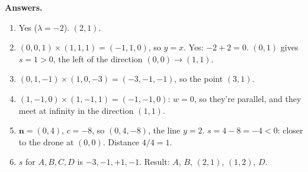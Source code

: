\documentclass[11pt,a4paper]{article}
\newcommand{\vect}[1]{\mathbf{#1}}
\begin{document}
\textbf{Answers.}
\begin{enumerate}[itemsep=1pt]
\item Yes ($\lambda=-2$). $(2,1)$.
\item $(0,0,1)\times(1,1,1)=(-1,1,0)$, so $y=x$. Yes: $-2+2=0$. $(0,1)$ gives $s=1>0$, the left of the direction $(0,0)\to(1,1)$.
\item $(0,1,-1)\times(1,0,-3)=(-3,-1,-1)$, so the point $(3,1)$.
\item $(1,-1,0)\times(1,-1,1)=(-1,-1,0)$: $w=0$, so they're parallel, and they meet at infinity in the direction $(1,1)$.
\item $\vect{n}=(0,4)$, $c=-8$, so $(0,4,-8)$, the line $y=2$. $s=4-8=-4<0$: closer to the drone at $(0,0)$. Distance $4/4=1$.
\item $s$ for $A,B,C,D$ is $-3,-1,+1,-1$. Result: $A$, $B$, $(2,1)$, $(1,2)$, $D$.
\end{enumerate}
\end{document}
